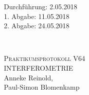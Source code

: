 



\begin{titlepage}
  \begin{flushleft}
 Durchführung: 2.05.2018\\
 1. Abgabe: 11.05.2018\\
 2. Abgabe: 24.05.2018
  \end{flushleft}


\HRule\\[1,0cm]

 \begin{center}


\textsc{\LARGE Praktikumsprotokoll V64}\\[1.5cm]
\textsc{\huge INTERFEROMETRIE} \\[5,5cm]

Anneke Reinold\footnotemark[1], \\
Paul-Simon Blomenkamp\footnotemark[2] \\[1,0cm]



 \end{center}
\HRule

 \vfill

\end{titlepage}






\printbibliography


